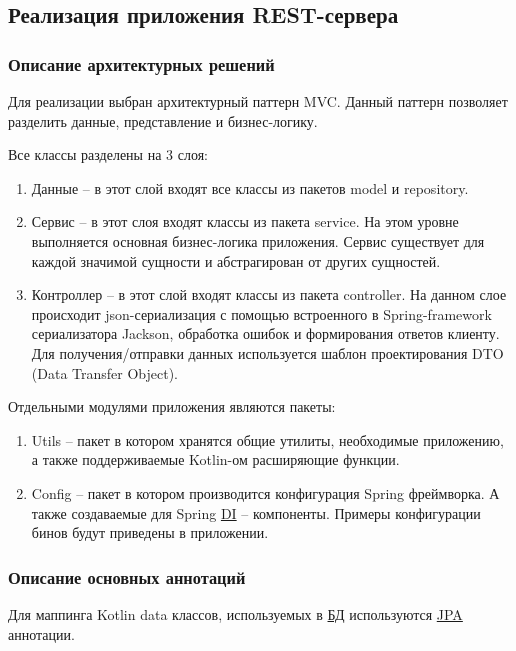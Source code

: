 \subsection{Реализация приложения REST-сервера}\label{subsec:3-impl-server}\indent

\subsubsection{Описание архитектурных решений}\indent

Для реализации выбран архитектурный паттерн MVC. Данный паттерн позволяет разделить данные, представление и бизнес-логику.

Все классы разделены на 3 слоя:
\begin{enumerate}
    \item Данные – в этот слой входят все классы из пакетов model и repository.
    \item Сервис – в этот слоя входят классы из пакета service.
    На этом уровне выполняется основная бизнес-логика приложения.
    Сервис существует для каждой значимой сущности и абстрагирован от других сущностей.
    \item Контроллер – в этот слой входят классы из пакета controller.
    На данном слое происходит json-сериализация с помощью встроенного в Spring-framework сериализатора Jackson, обработка ошибок и формирования ответов клиенту.
    Для получения/отправки данных используется шаблон проектирования DTO (Data Transfer Object).
\end{enumerate}
Отдельными модулями приложения являются пакеты:

\begin{enumerate}
    \item Utils – пакет в котором хранятся общие утилиты, необходимые приложению, а также поддерживаемые Kotlin-ом расширяющие функции.
    \item Config – пакет в котором производится конфигурация Spring фреймворка.
    А также создаваемые для Spring \hyperlink{gloss:di}{DI} – компоненты. Примеры конфигурации бинов будут приведены в приложении.
\end{enumerate}

\subsubsection{Описание основных аннотаций}\indent

Для маппинга Kotlin data классов, используемых в \hyperlink{gloss:db}{БД} используются \hyperlink{gloss:jpa}{JPA} аннотации.

